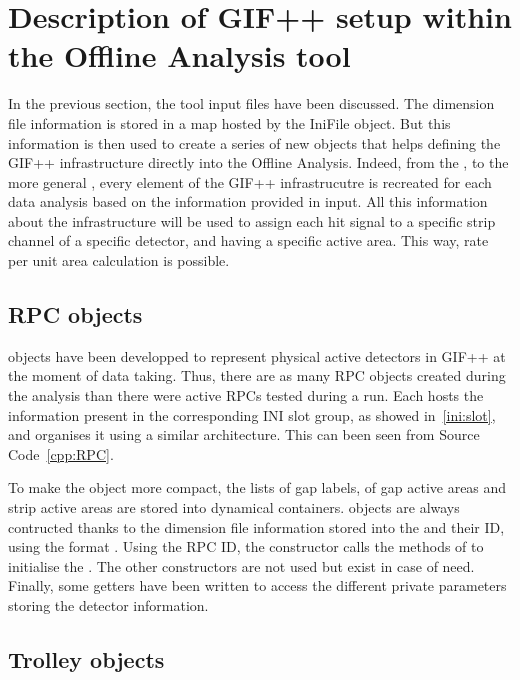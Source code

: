 \section{Description of GIF++ setup within the Offline Analysis tool}
\label{app2:sec:GIFsetup}

	In the previous section, the tool input files have been discussed. The dimension file information is stored in a map hosted by the IniFile object. But this information is then used to create a series of new objects that helps defining the GIF++ infrastructure directly into the Offline Analysis. Indeed, from the , to the more general , every element of the GIF++ infrastrucutre is recreated for each data analysis based on the information provided in input. All this information about the infrastructure will be used to assign each hit signal to a specific strip channel of a specific detector, and having a specific active area. This way, rate per unit area calculation is possible.\\
	
	\subsection{RPC objects}
	\label{app2:ssec:RPC}
	
	 objects have been developped to represent physical active detectors in GIF++ at the moment of data taking. Thus, there are as many RPC objects created during the analysis than there were active RPCs tested during a run. Each  hosts the information present in the corresponding INI slot group, as showed in~\ref{ini:slot}, and organises it using a similar architecture. This can been seen from Source Code~\ref{cpp:RPC}.
	
	To make the object more compact, the lists of gap labels, of gap active areas and strip active areas are stored into  dynamical containers.  objects are always contructed thanks to the dimension file information stored into the  and their ID, using the format . Using the RPC ID, the constructor calls the methods of  to initialise the . The other constructors are not used but exist in case of need. Finally, some getters have been written to access the different private parameters storing the detector information.\\
	
	\subsection{Trolley objects}
	\label{app2:ssec:Trolley}
	
